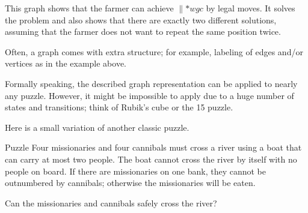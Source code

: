 \begin{center}
\end{center}

This graph shows that the farmer can achieve ${}{\parallel}{{*}wgc}$ by legal moves.
It solves the problem and also shows that there are exactly two different solutions,
assuming that the farmer does not want to repeat the same position twice. 
\qeds

Often, a graph comes with extra structure; for example, labeling of edges and/or vertices as in the example above.

Formally speaking, the described graph representation can be applied to nearly any puzzle.
However, it might be impossible to apply due to a huge number of states and transitions;
think of Rubik's cube or the 15 puzzle.

Here is a small variation of another classic puzzle.

\begin{thm}{Puzzle} Four missionaries and four cannibals must cross a river using a boat that can carry at most two people.
The boat cannot cross the river by itself with no people on board.
If there are missionaries on one bank, they cannot be outnumbered by cannibals;
otherwise the missionaries will be eaten.

Can the missionaries and cannibals safely cross the river?
\end{thm}

